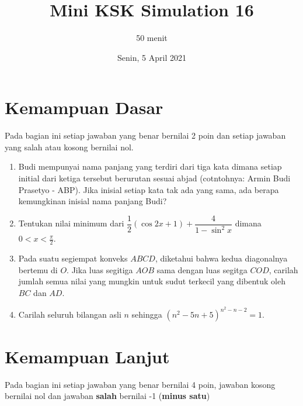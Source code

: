\documentclass[12pt]{scrartcl}
\title{Mini KSK Simulation 16}
\author{50 menit}
\date{Senin, 5 April 2021}
\begin{document}
	\maketitle

\renewcommand*\contentsname{Daftar Isi}
\tableofcontents

\newpage
	
	\section{Kemampuan Dasar}
	Pada bagian ini setiap jawaban yang benar bernilai 2 poin dan setiap jawaban yang salah
	atau kosong bernilai nol.
	\begin{enumerate}
		\item Budi mempunyai nama panjang yang terdiri dari tiga kata dimana setiap initial dari ketiga tersebut berurutan sesuai abjad (cotntohnya: Armin Budi Prasetyo - ABP). Jika inisial setiap kata tak ada yang sama, ada berapa kemungkinan inisial nama panjang Budi?
		
		\item Tentukan nilai minimum dari $\dfrac12 (\cos 2x +1) + \dfrac{4}{1-\sin^2 x}$ dimana $0 < x < \frac{\pi}{2}$.
		
		\item Pada suatu segiempat konveks $ABCD$, diketahui bahwa kedua diagonalnya bertemu di $O$. Jika luas segitiga $AOB$ sama dengan luas segitga $COD$, carilah jumlah semua nilai yang mungkin untuk sudut terkecil yang dibentuk oleh $BC$ dan $AD$.
		
		\item Carilah seluruh bilangan asli $n$ sehingga $(n^2-5n+5)^{n^2-n-2}=1$.
	\end{enumerate}

\section{Kemampuan Lanjut}
Pada bagian ini setiap jawaban yang benar bernilai 4 poin, jawaban kosong bernilai nol
dan jawaban \textbf{salah} bernilai -1 (\textbf{minus satu})
\end{document}
